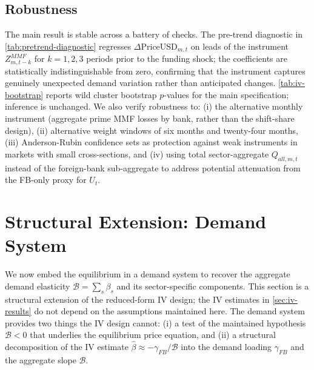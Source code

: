 \subsection{Robustness}
\label{subsec:robustness}

The main result is stable across a battery of checks. The pre-trend diagnostic
in \cref{tab:pretrend-diagnostic} regresses $\Delta\text{PriceUSD}_{m,t}$
on leads of the instrument $Z_{m,t-k}^{MMF}$ for $k = 1, 2, 3$ periods prior to
the funding shock; the coefficients are statistically indistinguishable from zero,
confirming that the instrument captures genuinely unexpected demand variation
rather than anticipated changes. \cref{tab:iv-bootstrap} reports wild cluster
bootstrap $p$-values for the main specification; inference is unchanged. We also
verify robustness to: (i) the alternative monthly instrument (aggregate prime MMF
losses by bank, rather than the shift-share design), (ii) alternative weight
windows of six months and twenty-four months, (iii) Anderson-Rubin confidence
sets as protection against weak instruments in markets with small cross-sections,
and (iv) using total sector-aggregate $Q_{all,m,t}$ instead of the foreign-bank
sub-aggregate to address potential attenuation from the FB-only proxy for $U_t$.


\section{Structural Extension: Demand System}
\label{sec:demand-system}

We now embed the equilibrium in a demand system to recover the aggregate demand
elasticity $\mathcal{B} = \sum_s \beta_s$ and its sector-specific components.
This section is a structural extension of the reduced-form IV design; the IV
estimates in \cref{sec:iv-results} do not depend on the assumptions maintained
here. The demand system provides two things the IV design cannot: (i) a test of
the maintained hypothesis $\mathcal{B} < 0$ that underlies the equilibrium price
equation, and (ii) a structural decomposition of the IV estimate $\hat\beta \approx
-\gamma_{FB}/\mathcal{B}$ into the demand loading $\gamma_{FB}$ and the
aggregate slope $\mathcal{B}$.

